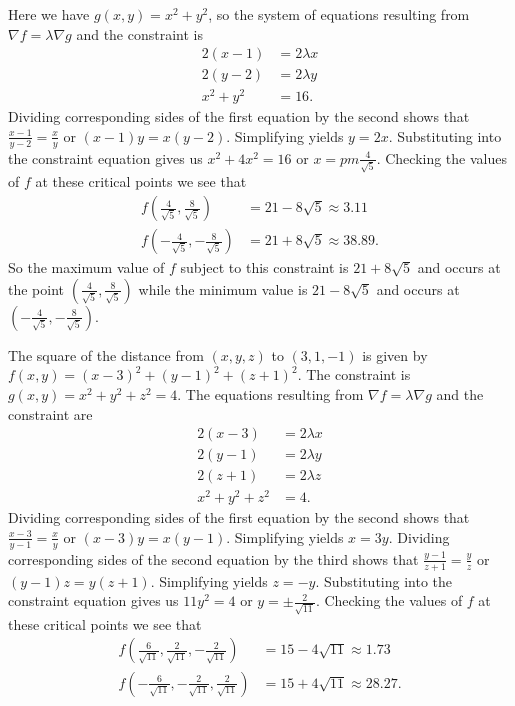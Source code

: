\begin{exercises}
 \begin{exerciseSolution}
	\ba
		\item Here we have $g(x,y) = x^2+y^2$, so the system of equations resulting from $\nabla f = \lambda \nabla g$ and the constraint is
\begin{align*}
2(x-1) &= 2\lambda x \\
2(y-2) &= 2\lambda y \\
x^2 + y^2 &= 16.
\end{align*}
Dividing corresponding sides of the first equation by the second shows that $\frac{x-1}{y-2} = \frac{x}{y}$ or $(x-1)y = x(y-2)$. Simplifying yields $y=2x$. Substituting into the constraint equation gives us $x^2+4x^2 = 16$ or $x = pm \frac{4}{\sqrt{5}}$. Checking the values of $f$ at these critical points we see that 
\begin{align*}
f\left(\frac{4}{\sqrt{5}}, \frac{8}{\sqrt{5}}\right) &= 21-8\sqrt{5} \approx 3.11 \\
f\left(-\frac{4}{\sqrt{5}}, -\frac{8}{\sqrt{5}}\right) &= 21+8\sqrt{5} \approx 38.89.
\end{align*}
So the maximum value of $f$ subject to this constraint is $21+8\sqrt{5}$ and occurs at the point $\left(\frac{4}{\sqrt{5}}, \frac{8}{\sqrt{5}}\right)$ while the minimum value is $21-8\sqrt{5}$ and occurs at $\left(-\frac{4}{\sqrt{5}}, -\frac{8}{\sqrt{5}}\right)$.

		\item The square of the distance from $(x,y,z)$ to $(3,1,-1)$ is given by $f(x,y) = (x-3)^2 + (y-1)^2 + (z+1)^2$. The constraint is $g(x,y) = x^2+y^2+z^2=4$. The equations resulting from $\nabla f = \lambda \nabla g$ and the constraint are  
\begin{align*}
2(x-3) &= 2\lambda x \\
2(y-1) &= 2\lambda y \\
2(z+1) &= 2\lambda z \\
x^2+y^2+z^2 &= 4.
\end{align*}
Dividing corresponding sides of the first equation by the second shows that $\frac{x-3}{y-1} = \frac{x}{y}$ or $(x-3)y = x(y-1)$. Simplifying yields $x=3y$. Dividing corresponding sides of the second equation by the third shows that $\frac{y-1}{z+1} = \frac{y}{z}$ or $(y-1)z = y(z+1)$. Simplifying yields $z=-y$. Substituting into the constraint equation gives us $11y^2=4$ or $y = \pm \frac{2}{\sqrt{11}}$. Checking the values of $f$ at these critical points we see that 
\begin{align*}
f\left(\frac{6}{\sqrt{11}}, \frac{2}{\sqrt{11}}, -\frac{2}{\sqrt{11}} \right) &= 15-4\sqrt{11} \approx 1.73 \\
f\left(-\frac{6}{\sqrt{11}}, -\frac{2}{\sqrt{11}}, \frac{2}{\sqrt{11}} \right) &= 15+4\sqrt{11} \approx 28.27.
\end{align*}


\end{exerciseSolution}
\end{exercises}

